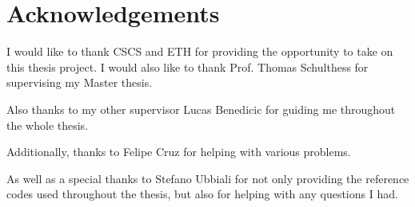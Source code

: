 \section*{Acknowledgements}

I would like to thank CSCS and ETH for providing the opportunity to take on this thesis project.
I would also like to thank Prof. Thomas Schulthess for supervising my Master thesis.

Also thanks to my other supervisor Lucas Benedicic for guiding me throughout the whole thesis.

Additionally, thanks to Felipe Cruz for helping with various problems.

As well as a special thanks to Stefano Ubbiali for not only providing the reference codes used throughout the thesis, but also for helping with any questions I had.
